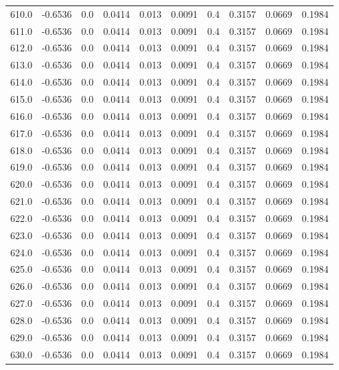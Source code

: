 \begin{longtable}{lrrrrrrrrr}
610.0 & -0.6536 & 0.0 & 0.0414 & 0.013 & 0.0091 & 0.4 & 0.3157 & 0.0669 & 0.1984 \\
611.0 & -0.6536 & 0.0 & 0.0414 & 0.013 & 0.0091 & 0.4 & 0.3157 & 0.0669 & 0.1984 \\
612.0 & -0.6536 & 0.0 & 0.0414 & 0.013 & 0.0091 & 0.4 & 0.3157 & 0.0669 & 0.1984 \\
613.0 & -0.6536 & 0.0 & 0.0414 & 0.013 & 0.0091 & 0.4 & 0.3157 & 0.0669 & 0.1984 \\
614.0 & -0.6536 & 0.0 & 0.0414 & 0.013 & 0.0091 & 0.4 & 0.3157 & 0.0669 & 0.1984 \\
615.0 & -0.6536 & 0.0 & 0.0414 & 0.013 & 0.0091 & 0.4 & 0.3157 & 0.0669 & 0.1984 \\
616.0 & -0.6536 & 0.0 & 0.0414 & 0.013 & 0.0091 & 0.4 & 0.3157 & 0.0669 & 0.1984 \\
617.0 & -0.6536 & 0.0 & 0.0414 & 0.013 & 0.0091 & 0.4 & 0.3157 & 0.0669 & 0.1984 \\
618.0 & -0.6536 & 0.0 & 0.0414 & 0.013 & 0.0091 & 0.4 & 0.3157 & 0.0669 & 0.1984 \\
619.0 & -0.6536 & 0.0 & 0.0414 & 0.013 & 0.0091 & 0.4 & 0.3157 & 0.0669 & 0.1984 \\
620.0 & -0.6536 & 0.0 & 0.0414 & 0.013 & 0.0091 & 0.4 & 0.3157 & 0.0669 & 0.1984 \\
621.0 & -0.6536 & 0.0 & 0.0414 & 0.013 & 0.0091 & 0.4 & 0.3157 & 0.0669 & 0.1984 \\
622.0 & -0.6536 & 0.0 & 0.0414 & 0.013 & 0.0091 & 0.4 & 0.3157 & 0.0669 & 0.1984 \\
623.0 & -0.6536 & 0.0 & 0.0414 & 0.013 & 0.0091 & 0.4 & 0.3157 & 0.0669 & 0.1984 \\
624.0 & -0.6536 & 0.0 & 0.0414 & 0.013 & 0.0091 & 0.4 & 0.3157 & 0.0669 & 0.1984 \\
625.0 & -0.6536 & 0.0 & 0.0414 & 0.013 & 0.0091 & 0.4 & 0.3157 & 0.0669 & 0.1984 \\
626.0 & -0.6536 & 0.0 & 0.0414 & 0.013 & 0.0091 & 0.4 & 0.3157 & 0.0669 & 0.1984 \\
627.0 & -0.6536 & 0.0 & 0.0414 & 0.013 & 0.0091 & 0.4 & 0.3157 & 0.0669 & 0.1984 \\
628.0 & -0.6536 & 0.0 & 0.0414 & 0.013 & 0.0091 & 0.4 & 0.3157 & 0.0669 & 0.1984 \\
629.0 & -0.6536 & 0.0 & 0.0414 & 0.013 & 0.0091 & 0.4 & 0.3157 & 0.0669 & 0.1984 \\
630.0 & -0.6536 & 0.0 & 0.0414 & 0.013 & 0.0091 & 0.4 & 0.3157 & 0.0669 & 0.1984 \\

\end{longtable}
